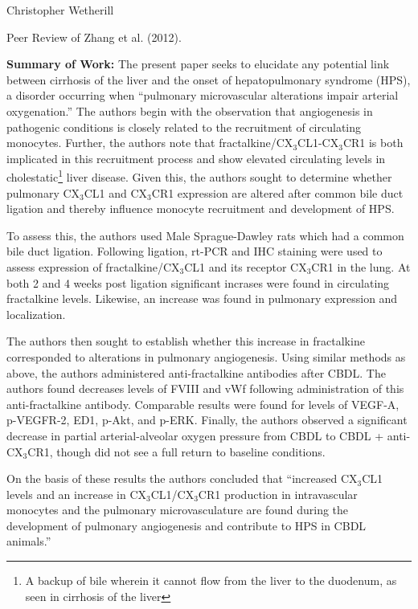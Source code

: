 \documentclass[11pt,letterpaper,final] {article}
\begin{document}

\noindent Christopher Wetherill

\begin{center}
Peer Review of Zhang et al. (2012).
\end{center}

{\bfseries Summary of Work:} The present paper seeks to elucidate any potential link between cirrhosis of the liver and the onset of hepatopulmonary syndrome (HPS), a disorder occurring when ``pulmonary microvascular alterations impair arterial oxygenation.'' The authors begin with the observation that angiogenesis in pathogenic conditions is closely related to the recruitment of circulating monocytes. Further, the authors note that fractalkine/CX$_3$CL1-CX$_3$CR1 is both implicated in this recruitment process and show elevated circulating levels in cholestatic\footnote{A backup of bile wherein it cannot flow from the liver to the duodenum, as seen in cirrhosis of the liver} liver disease. Given this, the authors sought to determine whether pulmonary CX$_3$CL1 and CX$_3$CR1 expression are altered after common bile duct ligation and thereby influence monocyte recruitment and development of HPS.

To assess this, the authors used Male Sprague-Dawley rats which had a common bile duct ligation. Following ligation, rt-PCR and IHC staining were used to assess expression of fractalkine/CX$_3$CL1 and its receptor CX$_3$CR1 in the lung. At both 2 and 4 weeks post ligation significant incrases were found in circulating fractalkine levels.  Likewise, an increase was found in pulmonary expression and localization.

The authors then sought to establish whether this increase in fractalkine corresponded to alterations in pulmonary angiogenesis. Using similar methods as above, the authors administered anti-fractalkine antibodies after CBDL. The authors found decreases levels of FVIII and vWf following administration of this anti-fractalkine antibody. Comparable results were found for levels of VEGF-A, p-VEGFR-2, ED1, p-Akt, and p-ERK. Finally, the authors observed a significant decrease in partial arterial-alveolar oxygen pressure from CBDL to CBDL + anti-CX$_3$CR1, though did not see a full return to baseline conditions.

On the basis of these results the authors concluded that ``increased CX$_3$CL1 levels and an increase in CX$_3$CL1/CX$_3$CR1 production in intravascular monocytes and the pulmonary microvasculature are found during the development of pulmonary angiogenesis and contribute to HPS in CBDL animals.''
\end{document}
